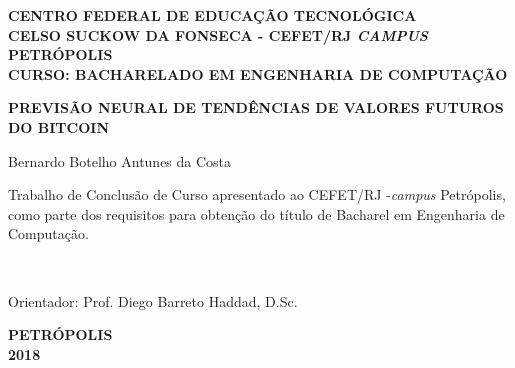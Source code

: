 \begin{center}
{\large \bf CENTRO FEDERAL DE EDUCAÇÃO TECNOLÓGICA} \vspace{1mm} \\
{\large \bf CELSO SUCKOW DA FONSECA - CEFET/RJ \textit{CAMPUS} PETRÓPOLIS} \vspace{1mm} \\
{\large \bf CURSO: BACHARELADO EM ENGENHARIA DE COMPUTAÇÃO}

\vspace*{3cm}
\normalsize{\large \bf PREVISÃO NEURAL DE TENDÊNCIAS DE VALORES FUTUROS DO BITCOIN}\\
\end{center}
\vspace{1.5cm}
\hfill
	\begin{flushright}
	Bernardo Botelho Antunes da Costa
	\end{flushright}
\vspace*{1.5cm}
\begin{flushright}
	\begin{minipage}{0.5\textwidth}
		{\normalsize
		Trabalho de Conclusão de Curso apresentado ao  
	 CEFET/RJ -{\it campus} Petrópolis, como parte dos requisitos para obtenção do título de Bacharel em Engenharia de Computação.}
	\end{minipage}\\[1.5cm]
\end{flushright}
\vspace{1.5cm}
\hfill
\begin{flushright}
Orientador: Prof. Diego Barreto Haddad, D.Sc.
\end{flushright}




\vspace*{3.3cm}
\begin{center}
{\bf PETRÓPOLIS \\ 2018}\\
\end{center}



